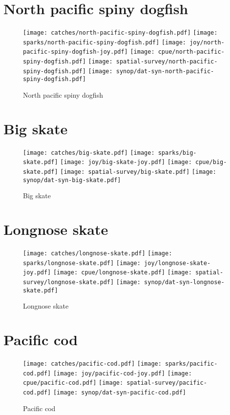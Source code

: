 \section*{North pacific spiny dogfish}

\begin{figure}[htbp]
\centering
\texttt{[image: catches/north-pacific-spiny-dogfish.pdf]}
\texttt{[image: sparks/north-pacific-spiny-dogfish.pdf]}
\texttt{[image: joy/north-pacific-spiny-dogfish-joy.pdf]}
\texttt{[image: cpue/north-pacific-spiny-dogfish.pdf]}
\texttt{[image: spatial-survey/north-pacific-spiny-dogfish.pdf]}
\texttt{[image: synop/dat-syn-north-pacific-spiny-dogfish.pdf]}
\caption{North pacific spiny dogfish}
\end{figure}
\clearpage
\section*{Big skate}

\begin{figure}[htbp]
\centering
\texttt{[image: catches/big-skate.pdf]}
\texttt{[image: sparks/big-skate.pdf]}
\texttt{[image: joy/big-skate-joy.pdf]}
\texttt{[image: cpue/big-skate.pdf]}
\texttt{[image: spatial-survey/big-skate.pdf]}
\texttt{[image: synop/dat-syn-big-skate.pdf]}
\caption{Big skate}
\end{figure}
\clearpage
\section*{Longnose skate}

\begin{figure}[htbp]
\centering
\texttt{[image: catches/longnose-skate.pdf]}
\texttt{[image: sparks/longnose-skate.pdf]}
\texttt{[image: joy/longnose-skate-joy.pdf]}
\texttt{[image: cpue/longnose-skate.pdf]}
\texttt{[image: spatial-survey/longnose-skate.pdf]}
\texttt{[image: synop/dat-syn-longnose-skate.pdf]}
\caption{Longnose skate}
\end{figure}
\clearpage
\section*{Pacific cod}

\begin{figure}[htbp]
\centering
\texttt{[image: catches/pacific-cod.pdf]}
\texttt{[image: sparks/pacific-cod.pdf]}
\texttt{[image: joy/pacific-cod-joy.pdf]}
\texttt{[image: cpue/pacific-cod.pdf]}
\texttt{[image: spatial-survey/pacific-cod.pdf]}
\texttt{[image: synop/dat-syn-pacific-cod.pdf]}
\caption{Pacific cod}
\end{figure}
\clearpage
